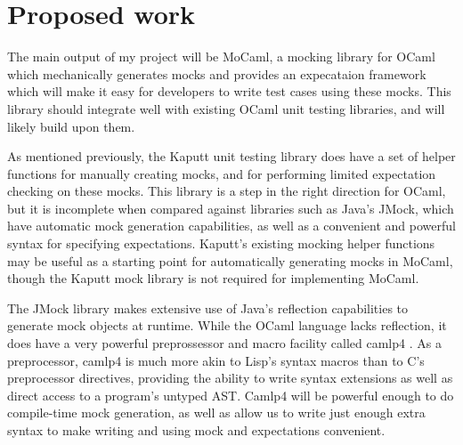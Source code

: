 \documentclass[proposal]{softeng}
\begin{document}
\section{Proposed work}


The main output of my project will be MoCaml, a mocking library for
OCaml which mechanically generates mocks and provides an expecataion
framework which will make it easy for developers to write test cases
using these mocks. This library should integrate well with existing
OCaml unit testing libraries, and will likely build upon them.

As mentioned previously, the Kaputt unit testing library does have a
set of helper functions for manually creating mocks, and for
performing limited expectation checking on these mocks. This library
is a step in the right direction for OCaml, but it is incomplete when
compared against libraries such as Java's JMock, which have automatic
mock generation capabilities, as well as a convenient and powerful
syntax for specifying expectations. Kaputt's existing mocking helper
functions may be useful as a starting point for automatically
generating mocks in MoCaml, though the Kaputt mock library is not
required for implementing MoCaml.

The JMock library makes extensive use of Java's reflection
capabilities to generate mock objects at runtime. While the OCaml
language lacks reflection, it does have a very powerful preprossessor
and macro facility called camlp4 \cite{www:reading_camlp4}. As a
preprocessor, camlp4 is much more akin to Lisp's syntax macros than to
C's preprocessor directives, providing the ability to write syntax
extensions as well as direct access to a program's untyped AST. Camlp4
will be powerful enough to do compile-time mock generation, as well as
allow us to write just enough extra syntax to make writing and using
mock and expectations convenient.
\end{document}

